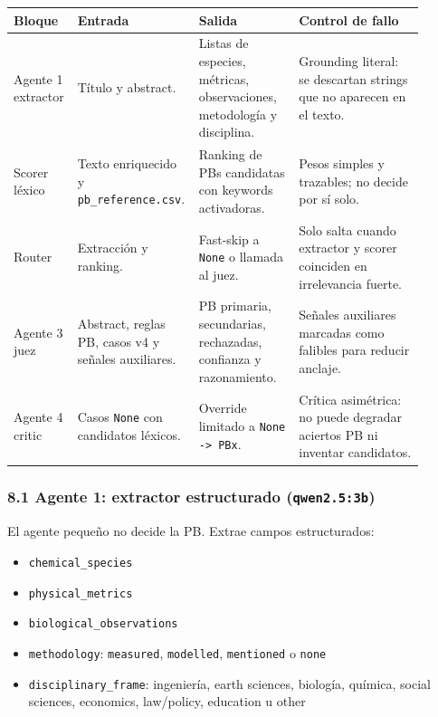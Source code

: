 \begin{center}
\scriptsize
\setlength{\tabcolsep}{4pt}
\renewcommand{\arraystretch}{1.18}
\begin{tabular}{p{0.14\linewidth}p{0.22\linewidth}p{0.24\linewidth}p{0.30\linewidth}}
\toprule
Bloque & Entrada & Salida & Control de fallo \\
\midrule
Agente 1 extractor & Título y abstract. & Listas de especies, métricas, observaciones, metodología y disciplina. & Grounding literal: se descartan strings que no aparecen en el texto. \\
Scorer léxico & Texto enriquecido y \texttt{pb\_reference.csv}. & Ranking de PBs candidatas con keywords activadoras. & Pesos simples y trazables; no decide por sí solo. \\
Router & Extracción y ranking. & Fast-skip a \texttt{None} o llamada al juez. & Solo salta cuando extractor y scorer coinciden en irrelevancia fuerte. \\
Agente 3 juez & Abstract, reglas PB, casos v4 y señales auxiliares. & PB primaria, secundarias, rechazadas, confianza y razonamiento. & Señales auxiliares marcadas como falibles para reducir anclaje. \\
Agente 4 critic & Casos \texttt{None} con candidatos léxicos. & Override limitado a \texttt{None -> PBx}. & Crítica asimétrica: no puede degradar aciertos PB ni inventar candidatos. \\
\bottomrule
\end{tabular}
\end{center}

\subsubsection{8.1 Agente 1: extractor estructurado (\texttt{qwen2.5:3b})}

El agente pequeño no decide la PB. Extrae campos estructurados:

\begin{itemize}
\item \texttt{chemical\_species}
\item \texttt{physical\_metrics}
\item \texttt{biological\_observations}
\item \texttt{methodology}: \texttt{measured}, \texttt{modelled}, \texttt{mentioned} o \texttt{none}
\item \texttt{disciplinary\_frame}: ingeniería, earth sciences, biología, química, social sciences, economics, law/policy, education u other
\end{itemize}

